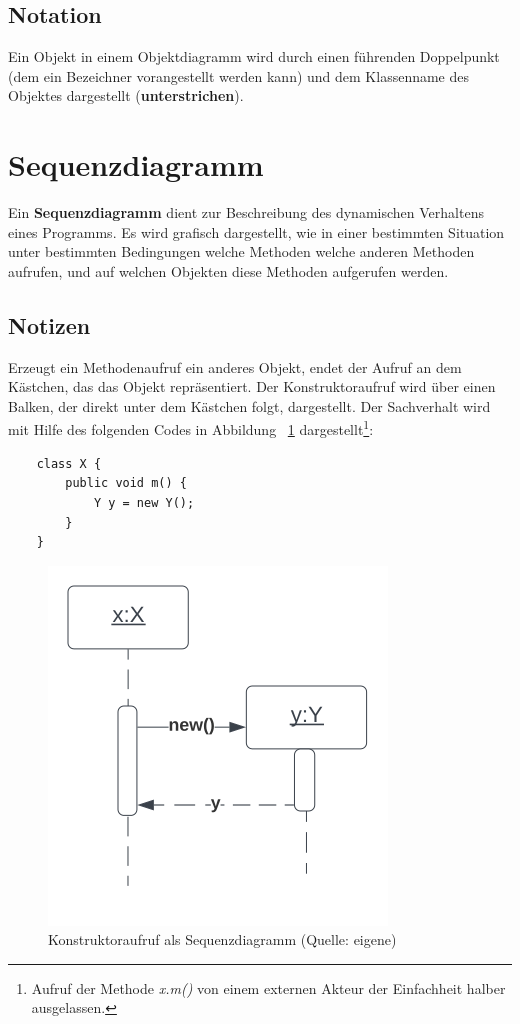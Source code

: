 \subsection*{Notation}
Ein Objekt in einem Objektdiagramm wird durch einen führenden Doppelpunkt (dem ein Bezeichner vorangestellt werden kann) und dem Klassenname des Objektes dargestellt (\textbf{unterstrichen}).

\section{Sequenzdiagramm}
Ein \textbf{Sequenzdiagramm} dient zur Beschreibung des dynamischen Verhaltens eines Programms.
Es wird grafisch dargestellt, wie in einer bestimmten Situation  unter bestimmten Bedingungen welche Methoden welche anderen Methoden aufrufen, und auf welchen Objekten diese Methoden aufgerufen werden.\\

\subsection*{Notizen}
Erzeugt ein Methodenaufruf ein anderes Objekt, endet der  Aufruf an dem Kästchen, das das Objekt repräsentiert.
Der Konstruktoraufruf wird über einen Balken, der direkt unter dem Kästchen folgt, dargestellt.
Der Sachverhalt wird mit Hilfe des folgenden Codes in Abbildung ~\ref{fig:cc-sequence} dargestellt\footnote{
    Aufruf der Methode \textit{x.m()} von einem externen Akteur der Einfachheit halber ausgelassen.
}:

\begin{verbatim}
    class X {
        public void m() {
            Y y = new Y();
        }
    }
\end{verbatim}

\begin{figure}
    \centering
    \includegraphics[scale=0.35]{chapters/Anhang/CheatSheets/img/constructor}
    \caption{Konstruktoraufruf als Sequenzdiagramm (Quelle: eigene)}
    \label{fig:cc-sequence}
\end{figure}


